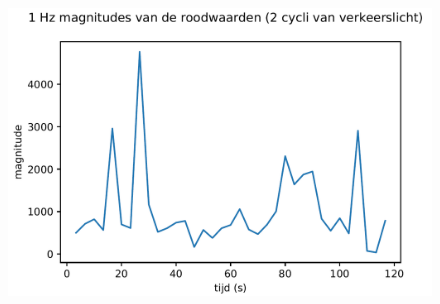 \documentclass[aspectratio=169,kulak,t,handout]{kulakbeamer} %
\begin{document}
\begin{frame}

\begin{figure}
	\centering
	\includegraphics[width=.6\textwidth]{magnitudes}
	\label{fig:magnitudes}
\end{figure}

\end{frame}
\end{document}
